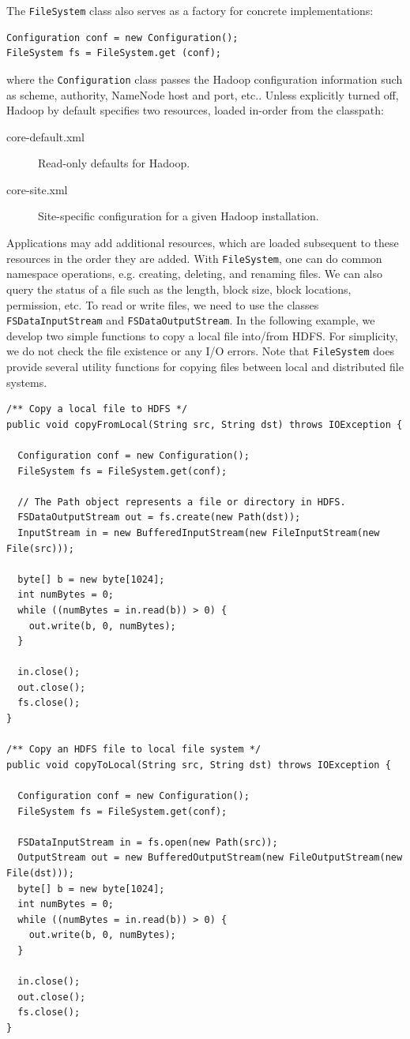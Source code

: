 \documentclass[11pt]{book}
\begin{document}
The \texttt{FileSystem} class also serves as a factory for concrete implementations:
\begin{lstlisting}
Configuration conf = new Configuration();
FileSystem fs = FileSystem.get (conf);
\end{lstlisting}
where the \texttt{Configuration} class passes the Hadoop configuration information such as scheme, authority, NameNode host and port, etc.. Unless explicitly turned off, Hadoop by default specifies two resources, loaded in-order from the classpath:
\begin{description}
\item[core-default.xml] Read-only defaults for Hadoop.
\item[core-site.xml] Site-specific configuration for a given Hadoop installation.
\end{description}
Applications may add additional resources, which are loaded subsequent to these resources in the order they are added. With \texttt{FileSystem}, one can do common namespace operations, e.g. creating, deleting, and renaming files. We can also query the status of a file such as the length, block size, block locations, permission, etc. To read or write files, we need to use the classes \texttt{FSDataInputStream} and \texttt{FSDataOutputStream}. In the following example, we develop two simple functions to copy a local file into/from HDFS. For simplicity, we do not check the file existence or any I/O errors. Note that \texttt{FileSystem} does provide several utility functions for copying files between local and distributed file systems.

\begin{lstlisting}
/** Copy a local file to HDFS */
public void copyFromLocal(String src, String dst) throws IOException {
 
  Configuration conf = new Configuration();
  FileSystem fs = FileSystem.get(conf);
  
  // The Path object represents a file or directory in HDFS.
  FSDataOutputStream out = fs.create(new Path(dst));
  InputStream in = new BufferedInputStream(new FileInputStream(new File(src)));
 
  byte[] b = new byte[1024];
  int numBytes = 0;
  while ((numBytes = in.read(b)) > 0) {
    out.write(b, 0, numBytes);
  }
 
  in.close();
  out.close();
  fs.close();
}

/** Copy an HDFS file to local file system */
public void copyToLocal(String src, String dst) throws IOException {
 
  Configuration conf = new Configuration();
  FileSystem fs = FileSystem.get(conf);
 
  FSDataInputStream in = fs.open(new Path(src));
  OutputStream out = new BufferedOutputStream(new FileOutputStream(new File(dst)));
  byte[] b = new byte[1024];
  int numBytes = 0;
  while ((numBytes = in.read(b)) > 0) {
    out.write(b, 0, numBytes);
  }
 
  in.close();
  out.close();
  fs.close();
}
\end{lstlisting}
\end{document}
